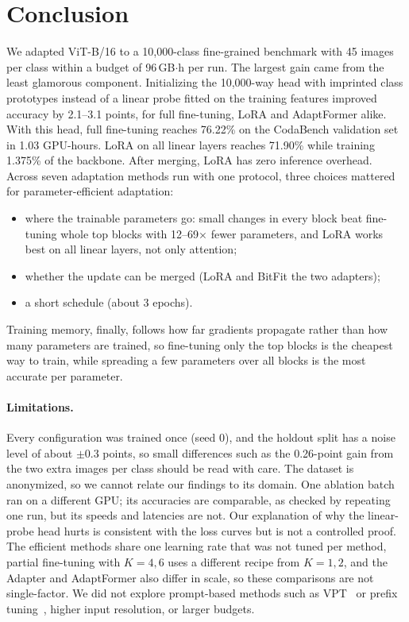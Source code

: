 \section{Conclusion}
\label{sec:conclusion}

We adapted ViT-B/16 to a 10,000-class fine-grained benchmark with 45 images per class within a budget of 96\,GB$\cdot$h per run.
The largest gain came from the least glamorous component.
Initializing the 10,000-way head with imprinted class prototypes instead of a linear probe fitted on the training features improved accuracy by 2.1--3.1 points, for full fine-tuning, LoRA and AdaptFormer alike.
With this head, full fine-tuning reaches 76.22\% on the CodaBench validation set in 1.03 GPU-hours.
LoRA on all linear layers reaches 71.90\% while training 1.375\% of the backbone.
After merging, LoRA has zero inference overhead.
Across seven adaptation methods run with one protocol, three choices mattered for parameter-efficient adaptation:
\begin{itemize}[leftmargin=*,itemsep=0pt,topsep=2pt]
    \item where the trainable parameters go: small changes in every block beat fine-tuning whole top blocks with 12--69$\times$ fewer parameters, and LoRA works best on all linear layers, not only attention;
    \item whether the update can be merged (LoRA and BitFit \vs the two adapters);
    \item a short schedule (about 3 epochs).
\end{itemize}
Training memory, finally, follows how far gradients propagate rather than how many parameters are trained, so fine-tuning only the top blocks is the cheapest way to train, while spreading a few parameters over all blocks is the most accurate per parameter.

\paragraph{Limitations.}
Every configuration was trained once (seed 0), and the holdout split has a noise level of about $\pm$0.3 points, so small differences such as the 0.26-point gain from the two extra images per class should be read with care.
The dataset is anonymized, so we cannot relate our findings to its domain.
One ablation batch ran on a different GPU; its accuracies are comparable, as checked by repeating one run, but its speeds and latencies are not.
Our explanation of why the linear-probe head hurts is consistent with the loss curves but is not a controlled proof.
The efficient methods share one learning rate that was not tuned per method, partial fine-tuning with $K = 4, 6$ uses a different recipe from $K = 1, 2$, and the Adapter and AdaptFormer also differ in scale, so these comparisons are not single-factor.
We did not explore prompt-based methods such as VPT~\cite{jia2022vpt} or prefix tuning~\cite{li2021prefix}, higher input resolution, or larger budgets.
